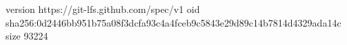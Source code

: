 version https://git-lfs.github.com/spec/v1
oid sha256:0d2446bb951b75a08f3dcfa93c4a4fceb9c5843e29d89c14b7814d4329ada14c
size 93224

